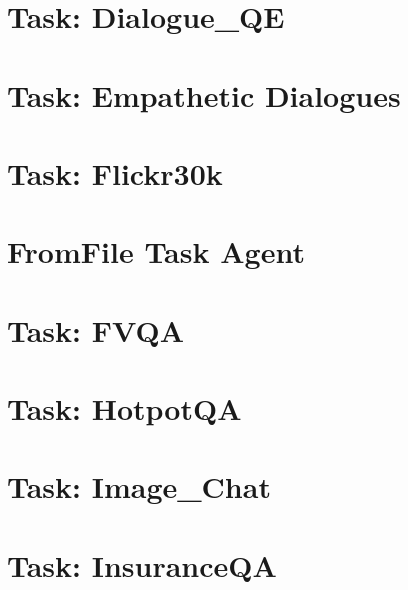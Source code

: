 \documentclass[twoside]{book}
\newcommand{\+}{\discretionary{\mbox{\scriptsize$\hookleftarrow$}}{}{}}
\begin{document}
\chapter{Task\+: Dialogue\+\_\+\+QE}
\label{md_parlai_tasks_dialogue_qe_README}

\chapter{Task\+: Empathetic Dialogues}
\label{md_parlai_tasks_empathetic_dialogues_README}

\chapter{Task\+: Flickr30k}
\label{md_parlai_tasks_flickr30k_README}

\chapter{From\+File Task Agent}
\label{md_parlai_tasks_fromfile_README}

\chapter{Task\+: F\+V\+QA}
\label{md_parlai_tasks_fvqa_README}

\chapter{Task\+: Hotpot\+QA}
\label{md_parlai_tasks_hotpotqa_README}

\chapter{Task\+: Image\+\_\+\+Chat}
\label{md_parlai_tasks_image_chat_README}

\chapter{Task\+: Insurance\+QA}
\label{md_parlai_tasks_insuranceqa_README}

\end{document}
